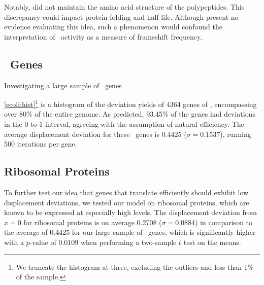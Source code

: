 \documentclass[12pt]{article}
\begin{document}
Notably, \citeauthor{weiss87} did not maintain the amino acid structure of the polypeptides.  
This discrepancy could impact protein folding and half-life.  Although \citeauthor{weiss87} 
present no evidence evaluating this idea, such a phenomenon would confound the interpretation 
of \bgals\ activity as a measure of frameshift frequency.

\subsection{\ecoli\ Genes}
\begin{cfigure}
  \caption{Investigating a large sample of \ecoli\ genes}
  \quad
\end{cfigure}

\autoref{ecoli:hist}\footnote{We truncate the histogram at three, excluding
  the outliers and less than 1\% of the sample.} is a histogram of the
deviation yields of 4364 genes of \ecoli, encompassing over 80\% of the entire
genome.  As predicted, 93.45\% of the genes had deviations in the 0
to 1 interval, agreeing with the assumption of natural efficiency.  The
average displacement deviation for these \ecoli\ genes is 0.4425 ($\sigma = 0.1537$), 
running 500 iterations per gene.

\subsection{Ribosomal Proteins}
\label{section:riboproteins}
To further test our idea that genes that translate efficiently should exhibit
low displacement deviations, we tested our model on ribosomal proteins, which
are known to be expressed at especially high levels.
The displacement deviation from $x=0$ for ribosomal proteins
is on average 0.2708 ($\sigma = 0.0884$) in comparison to the average of 0.4425 for our
large sample of \ecoli\ genes, which is significantly higher with a $p$-value of
0.0109 when performing a two-sample $t$ test on the means.
\end{document}
